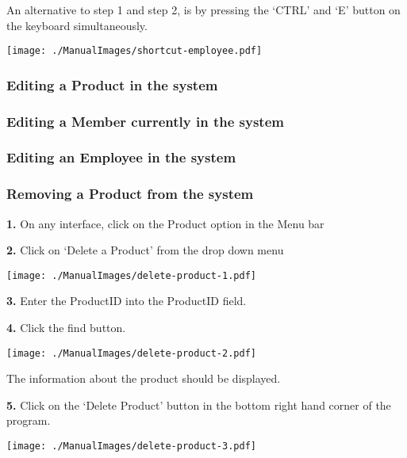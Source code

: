 An alternative to step 1 and step 2, is by pressing the `CTRL' and `E' button on the keyboard simultaneously.

\texttt{[image: ./ManualImages/shortcut-employee.pdf]}

\pagebreak
\subsubsection{Editing a Product in the system}
\label{fig:Editing a Product in the system}


\pagebreak
\subsubsection{Editing a Member currently in the system}
\label{fig:Editing a Member currently in the system}


\pagebreak
\subsubsection{Editing an Employee in the system}
\label{fig:Editing an Employee in the system}


\pagebreak
\subsubsection{Removing a Product from the system}
\label{fig:Removing a Product from the system}

\textbf{1.} On any interface, click on the Product option in the Menu bar

\textbf{2.} Click on `Delete a Product' from the drop down menu

\texttt{[image: ./ManualImages/delete-product-1.pdf]}

\textbf{3.} Enter the ProductID into the ProductID field.

\textbf{4.} Click the find button.

\texttt{[image: ./ManualImages/delete-product-2.pdf]}

The information about the product should be displayed.

\textbf{5.} Click on the `Delete Product' button in the bottom right hand corner of the program.

\texttt{[image: ./ManualImages/delete-product-3.pdf]}

